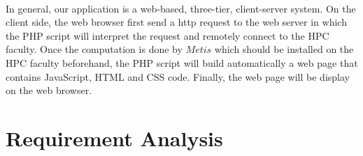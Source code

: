 \documentclass{cranfieldChart}
\begin{document}
\paragraph{}
In general, our application is a web-based, three-tier, client-server system. On the client side, the web browser first send a http request to the web server in which the PHP script will interpret the request and remotely connect to the HPC faculty. Once the computation is done by $Metis$ which should be installed on the HPC faculty beforehand, the PHP script will build automatically a web page that contains JavaScript, HTML and CSS code. Finally, the web page will be display on the web browser. 

\section{Requirement Analysis}
\end{document}
